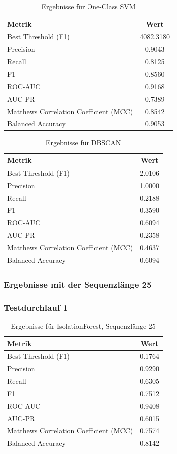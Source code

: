 \documentclass[a4paper,12pt]{article}
\begin{document}
	\begin{table}[H]
		\centering
		\begin{tabular}{l c}
			\hline
			Metrik & Wert \\
			\hline
			Best Threshold (F1) & 4082.3180 \\
			Precision & 0.9043 \\
			Recall & 0.8125 \\
			F1 & 0.8560 \\
			ROC-AUC & 0.9168 \\
			AUC-PR & 0.7389 \\
			Matthews Correlation Coefficient (MCC) & 0.8542 \\
			Balanced Accuracy & 0.9053 \\
			\hline
		\end{tabular}
		\caption{Ergebnisse für One-Class SVM}
	\end{table}
	
	\begin{table}[H]
		\centering
		\begin{tabular}{l c}
			\hline
			Metrik & Wert \\
			\hline
			Best Threshold (F1) & 2.0106 \\
			Precision & 1.0000 \\
			Recall & 0.2188 \\
			F1 & 0.3590 \\
			ROC-AUC & 0.6094 \\
			AUC-PR & 0.2358 \\
			Matthews Correlation Coefficient (MCC) & 0.4637 \\
			Balanced Accuracy & 0.6094 \\
			\hline
		\end{tabular}
		\caption{Ergebnisse für DBSCAN}
	\end{table}
	
		
	\subsubsection{Ergebnisse mit der Sequenzlänge 25}
	\subsubsection{Testdurchlauf 1}
	\begin{table}[H]
		\centering
		\begin{tabular}{l c}
			\hline
			Metrik & Wert \\
			\hline
			Best Threshold (F1) & 0.1764 \\
			Precision & 0.9290 \\
			Recall & 0.6305 \\
			F1 & 0.7512 \\
			ROC-AUC & 0.9408 \\
			AUC-PR & 0.6015 \\
			Matthews Correlation Coefficient (MCC) & 0.7574 \\
			Balanced Accuracy & 0.8142 \\
			\hline
		\end{tabular}
		\caption{Ergebnisse für IsolationForest, Sequenzlänge 25}
	\end{table}
	
\end{document}
